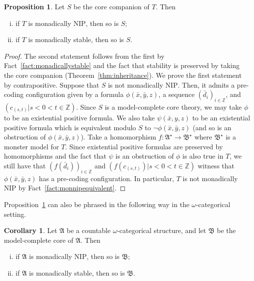 \documentclass{amsart}
\theoremstyle{definition}
\newtheorem{corollary}[theorem]{Corollary}
\newtheorem{proposition}[theorem]{Proposition}
\theoremstyle{remark}
\numberwithin{equation}{section}
\newcommand{\fa}{\mathfrak{A}}
\newcommand{\fb}{\mathfrak{B}}
\begin{document}
\begin{proposition}\label{nip_stab} Let $S$ be the core companion  of $T$. Then 
\begin{enumerate}[(i)]
    \item if $T$ is monadically $\mathrm{NIP}$, then so is $S$;
    \item if $T$ is monadically stable, then so is $S$. 
\end{enumerate}
\end{proposition}

\begin{proof} The second statement follows from the first by Fact~\ref{fact:monadicallystable} and the fact that stability is preserved by taking the core companion  (Theorem~\ref{thm:inheritance}). We prove the first statement by contrapositive. Suppose that $S$ is not monadically $\mathrm{NIP}$. Then, it admits a pre-coding configuration  given by a formula $\phi(\bar{x},\bar{y},z)$, a sequence $(\bar{d}_i)_{i\in\mathbb{Z}}$, and $(c_{(s,t)}\vert s<0<t\in\mathbb{Z})$. Since $S$ is a model-complete core theory, we may take $\phi$ to be an existential positive formula. We also take $\psi(\bar{x},y,z)$ to be an existential positive formula which is equivalent modulo $S$ to $\neg\phi(\bar{x},\bar{y},z)$ (and so is an obstruction of $\phi(\bar{x},\bar{y},z)$). Take a homomorphism $f \colon \fa^\star\to\fb^\star$ where $\fb^\star$ is a monster model for $T$. Since existential positive formulas are preserved by homomorphisms and the fact that $\psi$ is an obstruction of $\phi$ is also true in $T$, we still have that $(f(\bar{d}_i))_{i\in\mathbb{Z}}$ and $(f(c_{(s,t)})\vert s<0<t\in\mathbb{Z})$ witness that $\phi(\bar{x},\bar{y},z)$ has a pre-coding configuration. In particular, $T$ is not monadically $\mathrm{NIP}$ by Fact~\ref{fact:monnipequivalent}.
\end{proof}



	Proposition~\ref{nip_stab} can also be phrased in the following way in the $\omega$-categorical setting.
	
\begin{corollary}\label{nip_stab_omega}
	Let $\fa$ be a countable $\omega$-categorical structure, and let $\fb$ be the model-complete core of $\fa$. Then
\begin{enumerate}[(i)]
    \item\label{it:monnip} if $\fa$ is monadically $\mathrm{NIP}$, then so is $\fb$;
    \item\label{it:monstab} if $\fa$ is monadically stable, then so is $\fb$. 
\end{enumerate}
\end{corollary}
\end{document}
